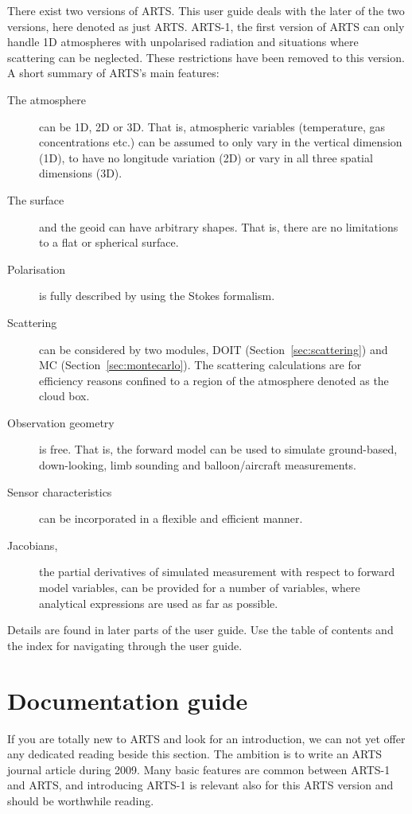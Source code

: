 There exist two versions of ARTS. This user guide deals with the later
of the two versions, here denoted as just ARTS. ARTS-1, the first
version of ARTS \citep{buehler:artst:05} can only handle 1D
atmospheres with unpolarised radiation and situations where scattering
can be neglected. These restrictions have been removed to this
version. A short summary of ARTS's main features:
\begin{description}
\item[The atmosphere] can be 1D, 2D or 3D. That is, atmospheric
  variables (temperature, gas concentrations etc.) can be assumed to
  only vary in the vertical dimension (1D), to have no longitude
  variation (2D) or vary in all three spatial dimensions (3D).
\item[The surface] and the geoid can have arbitrary shapes. That is,
  there are no limitations to a flat or spherical surface.
\item[Polarisation] is fully described by using the Stokes formalism.
\item[Scattering] can be considered by two modules, DOIT
  (Section~\ref{sec:scattering}) and MC
  (Section~\ref{sec:montecarlo}). The scattering calculations are for
  efficiency reasons confined to a region of the atmosphere denoted as
  the cloud box.
\item[Observation geometry] is free. That is, the forward model can be
  used to simulate ground-based, down-looking, limb sounding and
  balloon/aircraft measurements.
\item[Sensor characteristics] can be incorporated in a flexible and
  efficient manner.
\item[Jacobians,] the partial derivatives of simulated measurement
  with respect to forward model variables, can be provided for a
  number of variables, where analytical expressions are used as far as
  possible.
\end{description}
Details are found in later parts of the user guide. Use the table of
contents and the index for navigating through the user guide.



\section{Documentation guide}
\label{sec:concept:doc}

If you are totally new to ARTS and look for an introduction, we can
not yet offer any dedicated reading beside this section. The ambition
is to write an ARTS journal article during 2009. Many basic features
are common between ARTS-1 and ARTS, and \citet{buehler:artst:05}
introducing ARTS-1 is relevant also for this ARTS version and should
be worthwhile reading.

